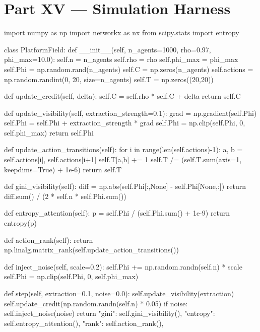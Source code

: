 \documentclass[11pt,a4paper]{article}
\theoremstyle{plain}
\theoremstyle{definition}
\theoremstyle{remark}
\begin{document}
\newpage

\section*{Part XV — Simulation Harness}

\lstlisting[language=Python, caption={RSVP Platform Field Simulation}]
import numpy as np
import networkx as nx
from scipy.stats import entropy

class PlatformField:
    def __init__(self, n_agents=1000, rho=0.97, phi_max=10.0):
        self.n = n_agents
        self.rho = rho
        self.phi_max = phi_max
        self.Phi = np.random.rand(n_agents)
        self.C = np.zeros(n_agents)
        self.actions = np.random.randint(0, 20, size=n_agents)
        self.T = np.zeros((20,20))

    def update_credit(self, delta):
        self.C = self.rho * self.C + delta
        return self.C

    def update_visibility(self, extraction_strength=0.1):
        grad = np.gradient(self.Phi)
        self.Phi = self.Phi + extraction_strength * grad
        self.Phi = np.clip(self.Phi, 0, self.phi_max)
        return self.Phi

    def update_action_transitions(self):
        for i in range(len(self.actions)-1):
            a, b = self.actions[i], self.actions[i+1]
            self.T[a,b] += 1
        self.T /= (self.T.sum(axis=1, keepdims=True) + 1e-6)
        return self.T

    def gini_visibility(self):
        diff = np.abs(self.Phi[:,None] - self.Phi[None,:])
        return diff.sum() / (2 * self.n * self.Phi.sum())

    def entropy_attention(self):
        p = self.Phi / (self.Phi.sum() + 1e-9)
        return entropy(p)

    def action_rank(self):
        return np.linalg.matrix_rank(self.update_action_transitions())

    def inject_noise(self, scale=0.2):
        self.Phi += np.random.randn(self.n) * scale
        self.Phi = np.clip(self.Phi, 0, self.phi_max)

    def step(self, extraction=0.1, noise=0.0):
        self.update_visibility(extraction)
        self.update_credit(np.random.randn(self.n) * 0.05)
        if noise: self.inject_noise(noise)
        return {
            "gini": self.gini_visibility(),
            "entropy": self.entropy_attention(),
            "rank": self.action_rank(),
        }
\end{document}
